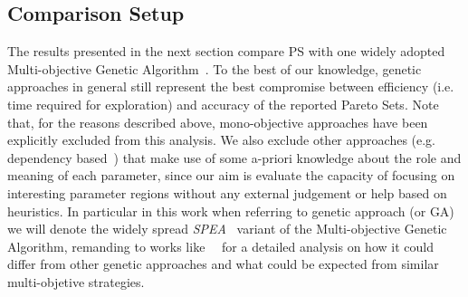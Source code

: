 %

\subsection{Comparison Setup}

The results presented in the next section compare PS with one widely
adopted Multi-objective Genetic Algorithm~\cite{knowles_techrep06}. To
the best of our knowledge, genetic approaches in general still
represent the best compromise between efficiency (i.e. time required
for exploration) and accuracy of the reported Pareto Sets.  Note that,
for the reasons described above, mono-objective approaches have been
explicitly excluded from this analysis.  We also exclude other
approaches (e.g.  dependency based~\cite{givargis_tvlsi02}) that make
use of some a-priori knowledge about the role and meaning of each
parameter, since our aim is evaluate the capacity of focusing on
interesting parameter regions without any external judgement or help
based on heuristics.  In particular in this work when referring to
genetic approach (or GA) we will denote the widely spread 
\emph{SPEA}~\cite{zitzler_eurogen01} variant of the Multi-objective
Genetic Algorithm, remanding to
works like~\cite{zitzler_ec00}~\cite{zitzler_tec03} for a detailed
analysis on how it could differ from other genetic approaches and what
could be expected from similar multi-objetive strategies. 

